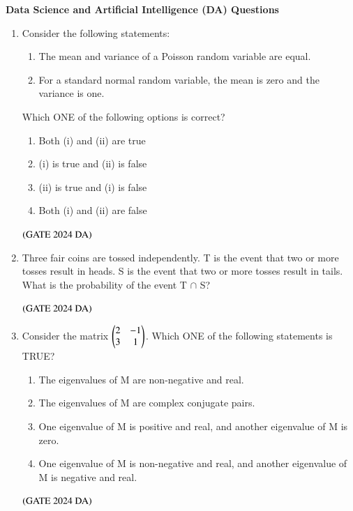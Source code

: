 \documentclass[journal,12pt,onecolumn]{IEEEtran}
\theoremstyle{remark}
\begin{document}
\textbf{Data Science and Artificial Intelligence (DA) Questions}
\begin{enumerate}[resume]


\item Consider the following statements:
\begin{enumerate}[label=(\roman*)]
    \item The mean and variance of a Poisson random variable are equal.
    \item For a standard normal random variable, the mean is zero and the variance is one.
\end{enumerate}

Which ONE of the following options is correct?
\begin{enumerate}
\item Both (i) and (ii) are true
\item (i) is true and (ii) is false
\item (ii) is true and (i) is false
\item Both (i) and (ii) are false
\end{enumerate}
\hfill $\left(\text{GATE 2024 DA}\right)$


\item Three fair coins are tossed independently. T is the event that two or more tosses result in heads. S is the event that two or more tosses result in tails. What is the probability of the event T $\cap$ S?
\begin{enumerate}
\end{enumerate}
\hfill $\left(\text{GATE 2024 DA}\right)$


\item Consider the matrix $
\begin{pmatrix}2 & -1 \\
3 & 1\end{pmatrix}
$.
Which ONE of the following statements is TRUE?
\begin{enumerate}
\item The eigenvalues of M are non-negative and real.
\item The eigenvalues of M are complex conjugate pairs.
\item One eigenvalue of M is positive and real, and another eigenvalue of M is zero.
\item One eigenvalue of M is non-negative and real, and another eigenvalue of M is negative and real.
\end{enumerate}
\hfill $\left(\text{GATE 2024 DA}\right)$



\end{enumerate}
\end{document}
